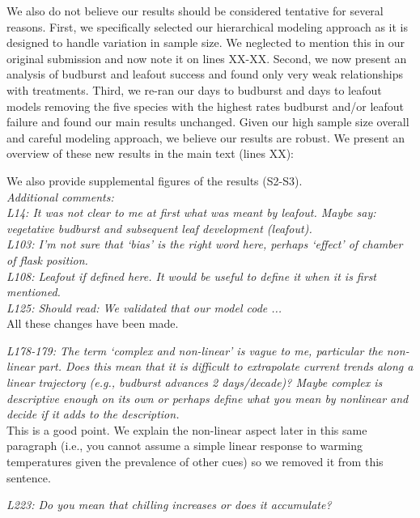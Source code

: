 \documentclass[11pt,a4paper]{article}
\begin{document}
We also do not believe our results should be considered tentative for several reasons. First, we specifically selected our hierarchical modeling approach as it is designed to handle variation in sample size. We neglected to mention this in our original submission and now note it on lines XX-XX. Second, we now present an analysis of budburst and leafout success and found only very weak relationships with treatments. Third, we re-ran our days to budburst and days to leafout models removing the five species with the highest rates budburst and/or leafout failure and found our main results unchanged. Given our high sample size overall and careful modeling approach, we believe our results are robust. We present an overview of these new results in the main text (lines XX):

\begin{quote}
\end{quote}

We also provide supplemental figures of the results (S2-S3). \\

\emph{Additional comments:\\
L14: It was not clear to me at first what was meant by leafout. Maybe say: vegetative
budburst and subsequent leaf development (leafout).\\
L103: I’m not sure that ‘bias’ is the right word here, perhaps ‘effect’ of chamber of flask
position.\\
L108: Leafout if defined here. It would be useful to define it when it is first mentioned.\\
L125:  Should read: We validated that our model code ...}\\

All these changes have been made.

\emph{L178-179: The term ‘complex and non-linear’ is vague to me, particular the non-linear part.
Does this mean that it is difficult to extrapolate current trends along a linear trajectory
(e.g., budburst advances 2 days/decade)?  Maybe complex is descriptive enough on its own or
perhaps define what you mean by nonlinear and decide if it adds to the description.}\\

This is a good point. We explain the non-linear aspect later in this same paragraph (i.e., you cannot assume a simple linear response to warming temperatures given the prevalence of other cues) so we removed it from this sentence.

\emph{L223: Do you mean that chilling increases or does it accumulate?}\\
\end{document}
